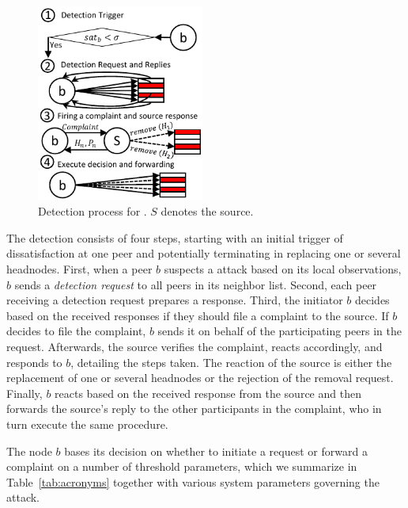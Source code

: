 \begin{figure}
 \centering
 \includegraphics[width=5.5cm,height=6.5cm]{./Figures/detection.pdf}
 
  \caption{Detection process for \drop. $S$ denotes the source.}
   \vspace{-3.5mm}
\label{detection-blocks} 
\end{figure}



The detection consists of four steps, starting with an initial trigger of dissatisfaction at one peer and potentially terminating in replacing one or several headnodes. 
First, when a peer $b$ suspects a \drop attack based on its local observations, $b$ sends a \emph{detection request} to all peers in its neighbor list.
Second, each peer receiving a detection request prepares a response. 
Third, the initiator $b$ decides based on the received responses if they should file a complaint to the source. 
If $b$ decides to file the complaint, $b$ sends it on behalf of the participating peers in the request. 
Afterwards, the source verifies the complaint, reacts accordingly, and responds to $b$, detailing the steps taken. 
The reaction of the source is either the replacement of one or several headnodes or the rejection of the removal request.
Finally, $b$ reacts based on the received response from the source and then forwards the source's reply to the other participants in the complaint, who in turn execute the same procedure.

The node $b$ bases its decision on whether to initiate a request or forward a complaint on a number of threshold parameters, which we summarize in Table~\ref{tab:acronyms} together with various system parameters governing the attack. 

